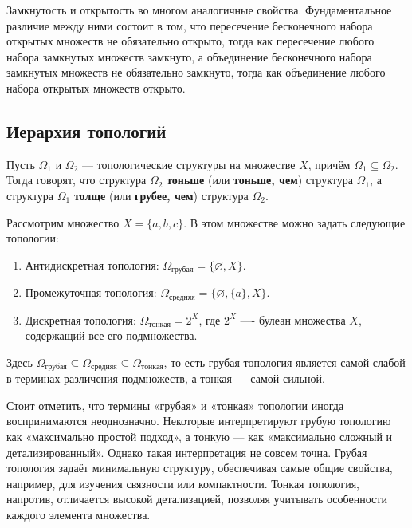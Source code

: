 Замкнутость и открытость во многом аналогичные свойства. Фундаментальное различие между ними состоит в том, что пересечение бесконечного набора открытых множеств не обязательно открыто, тогда как пересечение любого набора замкнутых множеств замкнуто, а объединение бесконечного набора замкнутых множеств не обязательно замкнуто, тогда как объединение любого набора открытых множеств открыто.

\subsection{Иерархия топологий}
\begin{definition}
	Пусть \( \Omega_1 \) и \( \Omega_2 \) — топологические структуры на множестве \( X \), причём \( \Omega_1 \subseteq \Omega_2 \). Тогда говорят, что структура \( \Omega_2 \) \textbf{тоньше} (или \textbf{тоньше, чем}) структура \( \Omega_1 \), а структура \( \Omega_1 \) \textbf{толще} (или \textbf{грубее, чем}) структура \( \Omega_2 \).
\end{definition}


\bigskip

\begin{example}
	Рассмотрим множество \( X = \{a, b, c\} \). В этом множестве можно задать следующие топологии:

	\begin{enumerate}
		\item Антидискретная топология: \( \Omega_{\text{грубая}} = \{\varnothing, X\} \).
		\item Промежуточная топология: \( \Omega_{\text{средняя}} = \{\varnothing, \{a\}, X\} \).
		\item Дискретная топология: \( \Omega_{\text{тонкая}} = 2^X \), где \( 2^X \) —- булеан множества \( X \), содержащий все его подмножества.
	\end{enumerate}
	
	Здесь \(\Omega_{\text{грубая}} \subseteq \Omega_{\text{средняя}} \subseteq \Omega_{\text{тонкая}}\), то есть грубая топология является самой слабой в терминах различения подмножеств, а тонкая — самой сильной.	
\end{example}
\bigskip

\begin{remark}
	Стоит отметить, что термины «грубая» и «тонкая» топологии иногда воспринимаются неоднозначно. Некоторые интерпретируют грубую топологию как «максимально простой подход», а тонкую — как «максимально сложный и детализированный». Однако такая интерпретация не совсем точна. Грубая топология задаёт минимальную структуру, обеспечивая самые общие свойства, например, для изучения связности или компактности. Тонкая топология, напротив, отличается высокой детализацией, позволяя учитывать особенности каждого элемента множества.  
\end{remark}


